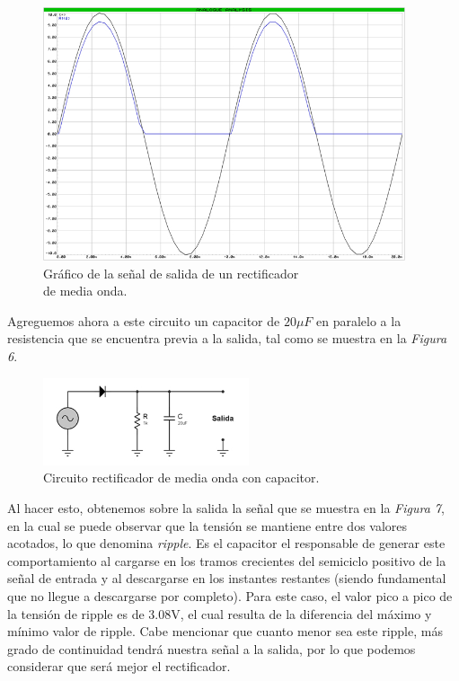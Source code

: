 \documentclass{article}
\begin{document}
\begin{figure}[h]
	\centering
	\includegraphics[width=0.95\textwidth]{images/4-4-2-grafico-circuito-rectificador-media-onda.jpg}
	\medskip
	\caption{Gráfico de la señal de salida de un rectificador\\ de media onda.}
\end{figure}
\bigskip\bigskip

	
	Agreguemos ahora a este circuito un capacitor de $20\mu F$ en paralelo a la resistencia que se encuentra previa a la salida, tal como se muestra en la \textit{Figura 6}.
\bigskip


\begin{figure}[h]
	\centering
	\includegraphics[width=0.54\textwidth]{images/4-4-3-circuito-rectificador-media-onda-con-filtro.jpg}
	\medskip
	\caption{Circuito rectificador de media onda con capacitor.}
\end{figure}


\newpage
	Al hacer esto, obtenemos sobre la salida la señal que se muestra en la \textit{Figura 7}, en la cual se puede observar que la tensión se mantiene entre dos valores acotados, lo que denomina \textit{ripple}. Es el capacitor el responsable de generar este comportamiento al cargarse en los tramos crecientes del semiciclo positivo de la señal de entrada y al descargarse en los instantes restantes (siendo fundamental que no llegue a descargarse por completo). Para este caso, el valor pico a pico de la tensión de ripple es de 3.08V, el cual resulta de la diferencia del máximo y mínimo valor de ripple. Cabe mencionar que cuanto menor sea este ripple, más grado de continuidad tendrá nuestra señal a la salida, por lo que podemos considerar que será mejor el rectificador.
\bigskip\bigskip
\end{document}
